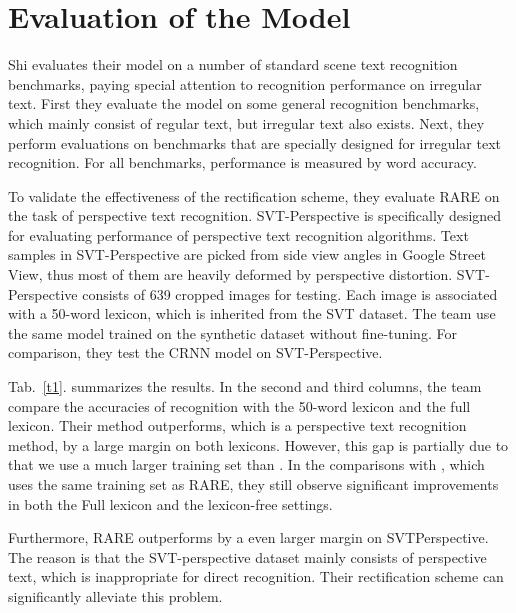 \documentclass[10pt,twocolumn,letterpaper]{article}
\begin{document}
\section{Evaluation of the Model}

Shi evaluates their model on a number of standard scene text recognition benchmarks, paying special attention to recognition performance on irregular text. First they evaluate the model on some general recognition benchmarks, which mainly consist of regular text, but irregular text also exists. Next, they perform evaluations on benchmarks that are specially designed for irregular text recognition. For all benchmarks, performance is measured by word accuracy.

To validate the effectiveness of the rectification scheme, they evaluate RARE on the task of perspective text recognition. SVT-Perspective \cite{quy2013recognizing} is specifically designed for evaluating performance of perspective text recognition algorithms. Text samples in SVT-Perspective are picked from side view angles in Google Street View, thus most of them are heavily deformed by perspective distortion. SVT-Perspective consists of 639 cropped images for testing. Each image is associated with a 50-word lexicon, which is inherited from the SVT \cite{wang2011end} dataset. The team use the same model trained on the synthetic dataset without fine-tuning. For comparison, they test the CRNN model \cite{shi2017end} on SVT-Perspective.

Tab.~\ref{t1}. summarizes the results. In the second and third columns, the team compare the accuracies of recognition with the 50-word lexicon and the full lexicon. Their method outperforms, which is a perspective text recognition method, by a large margin on both lexicons. However, this gap is partially due to that we use a much larger training set than \cite{quy2013recognizing}. In the comparisons with \cite{shi2017end}, which uses the same training set as RARE, they still observe significant improvements in both the Full lexicon and the lexicon-free settings. 

Furthermore, RARE outperforms by a even larger margin on SVTPerspective. The reason is that the SVT-perspective dataset mainly consists of perspective text, which is inappropriate for direct recognition. Their rectification scheme can significantly alleviate this problem.
\end{document}
